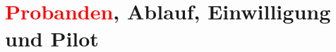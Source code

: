 \section[Probanden, Ablauf, Einwilligung und Pilot]{\textcolor{red}{Probanden}, Ablauf, Einwilligung und Pilot}%
\label{sec:teilnehmende}
%
